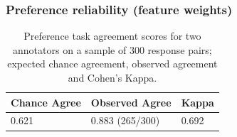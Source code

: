 \documentclass[handout,xcolor={dvipsnames}]{beamer}
\begin{document}
\begin{frame}
\frametitle{Preference reliability (feature weights)}
\begin{table}[htb!]
\begin{center}
\begin{tabular}{|l|l|l|}
\hline
 Chance Agree & Observed Agree & Kappa \\
\hline
0.621 & 0.883 (265/300) & 0.692 \\
\hline
\end{tabular}
\caption{\label{tab:ABAgreement} Preference task agreement scores for two annotators on a sample of 300 response pairs; expected chance agreement, observed agreement and Cohen's Kappa.}
\end{center}
\end{table}

\end{frame}
\end{document}

